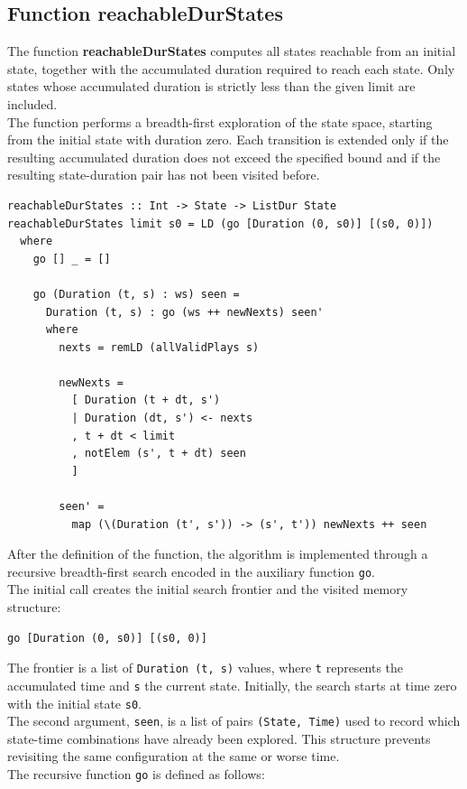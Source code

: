 \documentclass[a4paper,12pt]{report}
\begin{document}
\subsection{Function reachableDurStates}
The function \textbf{reachableDurStates} computes all states reachable from an initial state,
together with the accumulated duration required to reach each state.
Only states whose accumulated duration is strictly less than the given limit are included.
\\[1em]
The function performs a breadth-first exploration of the state space, starting from the initial state
with duration zero. Each transition is extended only if the resulting accumulated duration does not
exceed the specified bound and if the resulting state-duration pair has not been visited before.
\begin{verbatim}
reachableDurStates :: Int -> State -> ListDur State
reachableDurStates limit s0 = LD (go [Duration (0, s0)] [(s0, 0)])
  where
    go [] _ = []

    go (Duration (t, s) : ws) seen =
      Duration (t, s) : go (ws ++ newNexts) seen'
      where
        nexts = remLD (allValidPlays s)

        newNexts =
          [ Duration (t + dt, s')
          | Duration (dt, s') <- nexts
          , t + dt < limit
          , notElem (s', t + dt) seen
          ]

        seen' =
          map (\(Duration (t', s')) -> (s', t')) newNexts ++ seen
\end{verbatim}
After the definition of the function, the algorithm is implemented through a
recursive breadth-first search encoded in the auxiliary function \texttt{go}.
\\[1em]
The initial call 
creates the initial search frontier and the visited memory structure:
\begin{verbatim}
go [Duration (0, s0)] [(s0, 0)]
\end{verbatim}
The frontier is a list of \texttt{Duration (t, s)} values, where \texttt{t}
represents the accumulated time and \texttt{s} the current state.
Initially, the search starts at time zero with the initial state \texttt{s0}.
\\[1em]
The second argument, \texttt{seen}, is a list of pairs \texttt{(State, Time)}
used to record which state-time combinations have already been explored.
This structure prevents revisiting the same configuration at the same or worse time.
\\[1em]
The recursive function \texttt{go} is defined as follows:
\end{document}
